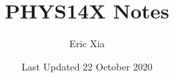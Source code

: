 \documentclass{article}
\title{PHYS14X Notes}
\author{Eric Xia}
\date{Last Updated 22 October 2020}
\begin{document}
    \maketitle
    \tableofcontents
    \pagebreak



    
    
    
    
    
    
    
    
    
    
\end{document}
